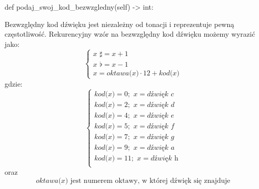 \documentclass[dokumentacja.tex]{subfiles}
\begin{document}
\begin{itemize}
        \begin{python}
        def podaj_swoj_kod_bezwzgledny(self) -> int:
        \end{python}
        \nopagebreak
        Bezwzględny kod dźwięku jest niezależny od tonacji i reprezentuje pewną częstotliwość. Rekurencyjny wzór na bezwzględny kod dźwięku możemy wyrazić jako:
        \[
            \begin{cases}
                \textit{x } \sharp = \textit{x} + 1 \\
                \textit{x } \flat= \textit{x} - 1 \\
                \textit{x} = \textit{oktawa(x)} \cdot 12 + \textit{kod(x)}
            \end{cases}
            \]
            gdzie:
            \[
            \begin{cases}
                \textit{kod(x)} = 0; \textit{  x} = \textit{dźwięk c} \\
                \textit{kod(x)} = 2; \textit{  x} = \textit{dźwięk d} \\
                \textit{kod(x)} = 4; \textit{  x} = \textit{dźwięk e} \\
                \textit{kod(x)} = 5; \textit{  x} = \textit{dźwięk f} \\
                \textit{kod(x)} = 7; \textit{  x} = \textit{dźwięk g} \\
                \textit{kod(x)} = 9; \textit{  x} = \textit{dźwięk a} \\
                \textit{kod(x)} = 11; \textit{  x} = \textit{dźwięk h} \\
            \end{cases}
            \]
            oraz
            \begin{equation}
                \textit{oktawa(x)} \text{ jest numerem oktawy, w której dźwięk się znajduje}
            \end{equation}
            
    
\end{itemize}
\end{document}

